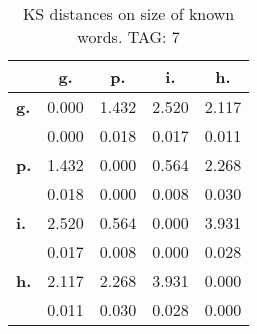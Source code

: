 \begin{table}[h!]
\begin{center}
\begin{tabular}{| l || c | c | c | c |}\hline
 & {\bf g.} & {\bf p.} & {\bf i.} & {\bf h.} \\\hline\hline
{\bf g.} & 0.000 & 1.432 & 2.520 & 2.117 \\
{\bf } & 0.000 & 0.018 & 0.017 & 0.011 \\\hline
{\bf p.} & 1.432 & 0.000 & 0.564 & 2.268 \\
{\bf } & 0.018 & 0.000 & 0.008 & 0.030 \\\hline
{\bf i.} & 2.520 & 0.564 & 0.000 & 3.931 \\
{\bf } & 0.017 & 0.008 & 0.000 & 0.028 \\\hline
{\bf h.} & 2.117 & 2.268 & 3.931 & 0.000 \\
{\bf } & 0.011 & 0.030 & 0.028 & 0.000 \\\hline
\end{tabular}
\caption{KS distances on size of known words. TAG: 7}
\end{center}
\end{table}